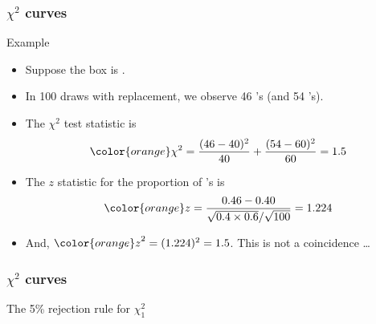 \documentclass[handout]{beamer}
\begin{document}

   \begin{frame} \frametitle{$\chi^2$ curves}

   \begin{block}
   {Example}

   \begin{itemize}
   \item Suppose the box is .
   \item In 100 draws with replacement, we observe 46 's
   (and 54 's).
   \item The $\chi^2$ test statistic is
     $$
     {\color{orange} \chi^2} = \frac{(46-40)^2}{40} + \frac{(54-60)^2}{60} = 1.5
     $$
   \item The $z$ statistic for the proportion of 's is
   $$
   {\color{orange} z} = \frac{0.46-0.40}{\sqrt{0.4 \times 0.6} / \sqrt{100}} = 1.224
   $$
   \item And, ${\color{orange} z}^2 = (1.224)^2 = 1.5$. This is not a coincidence \dots

   \end{itemize}
   \end{block}
   \end{frame}



   \begin{frame}
   \frametitle{$\chi^2$ curves}
   \begin{center}
   \end{center}
   The 5\% rejection rule for $\chi^2_{1}$
   \end{frame}
\end{document}
